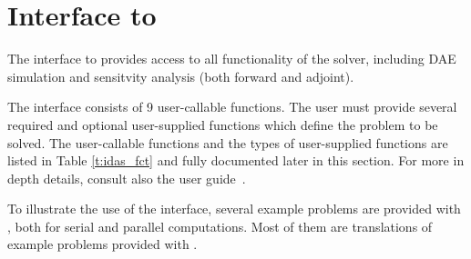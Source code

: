 \newpage
\section{{\matlab} Interface to {\idas}}

The {\matlab} interface to {\idas} provides access to all functionality of the 
{\idas} solver, including DAE simulation and sensitvity analysis (both forward 
and adjoint).

The interface consists of 9 user-callable functions. The user must provide
several required and optional user-supplied functions which define the problem to be solved.
The user-callable functions and the types of user-supplied functions are listed in
Table \ref{t:idas_fct} and fully documented later in this section.
For more in depth details, consult also the {\idas} user guide~\cite{ida_ug}.

To illustrate the use of the {\idas} {\matlab} interface, several example problems are provided
with {\sundialsTB}, both for serial and parallel computations. Most of them are {\matlab} translations of example
problems provided with {\idas}.

